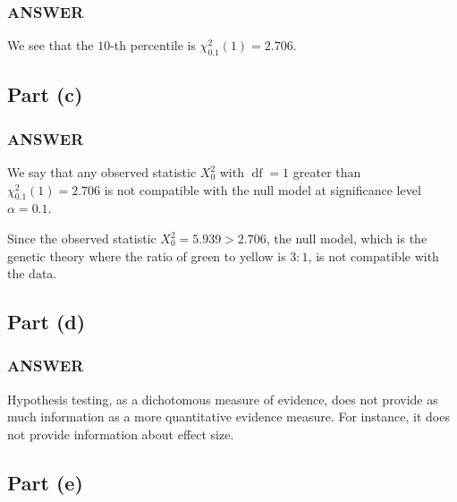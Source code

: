 \documentclass[
]{article}
\begin{document}
\hypertarget{answer-1}{%
\subsubsection{ANSWER}\label{answer-1}}

We see that the \(10\)-th percentile is \(\chi^2_{0.1}(1) = 2.706\).

\hypertarget{part-c}{%
\subsection{Part (c)}\label{part-c}}


\hypertarget{answer-2}{%
\subsubsection{ANSWER}\label{answer-2}}

We say that any observed statistic \(X_0^2\) with
\(\operatorname{df}=1\) greater than \(\chi^2_{0.1}(1) = 2.706\) is not
compatible with the null model at significance level \(\alpha = 0.1\).

Since the observed statistic \(X_0^2 = 5.939 > 2.706\), the null model,
which is the genetic theory where the ratio of green to yellow is
\(3:1\), is not compatible with the data.

\hypertarget{part-d}{%
\subsection{Part (d)}\label{part-d}}


\hypertarget{answer-3}{%
\subsubsection{ANSWER}\label{answer-3}}

Hypothesis testing, as a dichotomous measure of evidence, does not
provide as much information as a more quantitative evidence measure. For
instance, it does not provide information about effect size.

\hypertarget{part-e}{%
\subsection{Part (e)}\label{part-e}}
\end{document}
